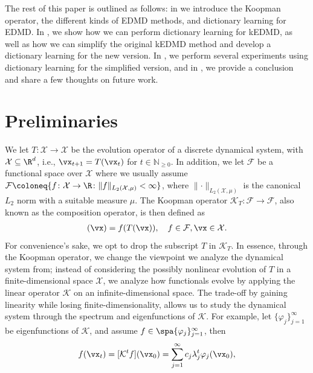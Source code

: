 \documentclass{article}
\begin{document}
The rest of this paper is outlined as follows: in  we introduce the Koopman operator, the different kinds of EDMD methods, and dictionary learning for EDMD. In , we show how we can perform dictionary learning for kEDMD, as well as how we can simplify the original kEDMD method and develop a dictionary learning for the new version. In , we perform several experiments using dictionary learning for the simplified version, and in , we provide a conclusion and share a few thoughts on future work.






\section{Preliminaries}\label{sec:preliminaries}
We let \(T \colon \mathcal{X} \rightarrow  \mathcal{X}\) be the evolution operator of a discrete dynamical system, with \(\mathcal{X} \subseteq \R^d\), i.e., \(\vx_{t+1} = T(\vx_t)\) for \(t \in \mathbb{N}_{\geq 0}\). In addition, we let \(\mathcal{F}\) be a functional space over \(\mathcal{X}\) where we usually assume \(\mathcal{F}\coloneq \{f\colon \mathcal{X}\rightarrow \R \colon \lVert f\rVert_{L_2(\mathcal{X}, \mu)} < \infty\}\), where \(\lVert \cdot \rVert_{L_2(\mathcal{X}, \mu)}\) is the canonical \(L_2\) norm with a suitable measure \(\mu\). The Koopman operator \(\mathcal{K}_T\colon \mathcal{F} \rightarrow \mathcal{F}\), also known as the composition operator, is then defined as 
\begin{align*}
    [\mathcal{K}_T f](\vx) = f(T(\vx)), \quad f \in \mathcal{F}, \vx \in \mathcal{X}. 
\end{align*}
For convenience’s sake, we opt to drop the subscript \(T\) in \(\mathcal{K}_T\). In essence, through the Koopman operator, we change the viewpoint we analyze the dynamical system from; instead of considering the possibly nonlinear evolution of \(T\) in a finite-dimensional space \(\mathcal{X}\), we analyze how functionals evolve by applying the linear operator \(\mathcal{K}\) on an infinite-dimensional space. The trade-off by gaining linearity while losing finite-dimensionality, allows us to study the dynamical system through the spectrum and eigenfunctions of \(\mathcal{K}\). For example, let \(\{\varphi_j\}_{j=1}^{\infty}\) be eigenfunctions of \(\mathcal{K}\), and assume \(f \in \spa \{\varphi_j\}_{j=1}^{\infty}\), then
\begin{align*}
    f(\vx_t) = [\mathcal{K}^t f](\vx_0) = \sum_{j=1}^{\infty} c_j \lambda_j^t \varphi_j(\vx_0),
\end{align*}
\end{document}
